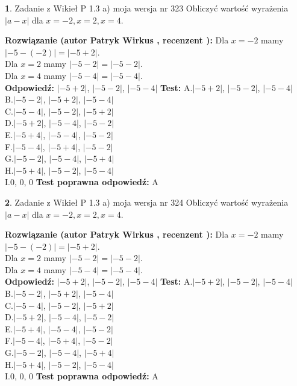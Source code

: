 \documentclass[12pt, a4paper]{article}
\theoremstyle{definition} %
\newtheorem{zad}{}
\newcommand{\zadStart}[1]{\begin{zad}#1\newline}
\newcommand{\zadStop}{\end{zad}}
\newcommand{\rozwStart}[2]{\noindent \textbf{Rozwiązanie (autor #1 , recenzent #2): }\newline}
\newcommand{\rozwStop}{\newline}
\newcommand{\odpStart}{\noindent \textbf{Odpowiedź:}\newline}
\newcommand{\odpStop}{\newline}
\newcommand{\testStart}{\noindent \textbf{Test:}\newline}
\newcommand{\testStop}{\newline}
\newcommand{\kluczStart}{\noindent \textbf{Test poprawna odpowiedź:}\newline}
\newcommand{\kluczStop}{\newline}
\begin{document}
\zadStart{Zadanie z Wikieł P 1.3 a) moja wersja nr 323}
Obliczyć wartość wyrażenia $|a - x|$ dla $x=-2,x=2,x=4$.
\zadStop
\rozwStart{Patryk Wirkus}{}
Dla $x = -2$ mamy $|-5 - (-2)| = |-5 + 2|$.\\
Dla $x = 2$ mamy $|-5 - 2| = |-5 - 2|$.\\
Dla $x = 4$ mamy $|-5 - 4| = |-5 - 4|$.\\
\rozwStop
\odpStart
$|-5 + 2|$, $|-5 - 2|$, $|-5 - 4|$
\odpStop
\testStart
A.$|-5 + 2|$, $|-5 - 2|$, $|-5 - 4|$\\
B.$|-5 - 2|$, $|-5 + 2|$, $|-5 - 4|$\\
C.$|-5 - 4|$, $|-5 - 2|$, $|-5 + 2|$\\
D.$|-5 + 2|$, $|-5 - 4|$, $|-5 - 2|$\\
E.$|-5 + 4|$, $|-5 - 4|$, $|-5 - 2|$\\
F.$|-5 - 4|$, $|-5 + 4|$, $|-5 - 2|$\\
G.$|-5 - 2|$, $|-5 - 4|$, $|-5 + 4|$\\
H.$|-5 + 4|$, $|-5 - 2|$, $|-5 - 4|$\\
I.$0$, $0$, $0$
\testStop
\kluczStart
A
\kluczStop



\zadStart{Zadanie z Wikieł P 1.3 a) moja wersja nr 324}
Obliczyć wartość wyrażenia $|a - x|$ dla $x=-2,x=2,x=4$.
\zadStop
\rozwStart{Patryk Wirkus}{}
Dla $x = -2$ mamy $|-5 - (-2)| = |-5 + 2|$.\\
Dla $x = 2$ mamy $|-5 - 2| = |-5 - 2|$.\\
Dla $x = 4$ mamy $|-5 - 4| = |-5 - 4|$.\\
\rozwStop
\odpStart
$|-5 + 2|$, $|-5 - 2|$, $|-5 - 4|$
\odpStop
\testStart
A.$|-5 + 2|$, $|-5 - 2|$, $|-5 - 4|$\\
B.$|-5 - 2|$, $|-5 + 2|$, $|-5 - 4|$\\
C.$|-5 - 4|$, $|-5 - 2|$, $|-5 + 2|$\\
D.$|-5 + 2|$, $|-5 - 4|$, $|-5 - 2|$\\
E.$|-5 + 4|$, $|-5 - 4|$, $|-5 - 2|$\\
F.$|-5 - 4|$, $|-5 + 4|$, $|-5 - 2|$\\
G.$|-5 - 2|$, $|-5 - 4|$, $|-5 + 4|$\\
H.$|-5 + 4|$, $|-5 - 2|$, $|-5 - 4|$\\
I.$0$, $0$, $0$
\testStop
\kluczStart
A
\kluczStop
\end{document}
